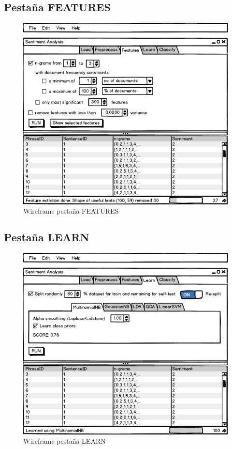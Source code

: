 \FloatBarrier
\newpage
\subsection{Pestaña FEATURES}


\begin{figure}[htbp]
\centering
\includegraphics[width=12cm,clip=true,trim=0 0 0 38pt]{gui-3-features}
\caption{Wireframe pestaña FEATURES}
\label{fig:gui-3-features}
\end{figure}

\FloatBarrier
\newpage
\subsection{Pestaña LEARN}

\begin{figure}[htbp]
\centering
\includegraphics[width=12cm,clip=true,trim=0 0 0 38pt]{gui-4-learn}
\caption{Wireframe pestaña LEARN}
\label{fig:gui-4-learn}
\end{figure}

